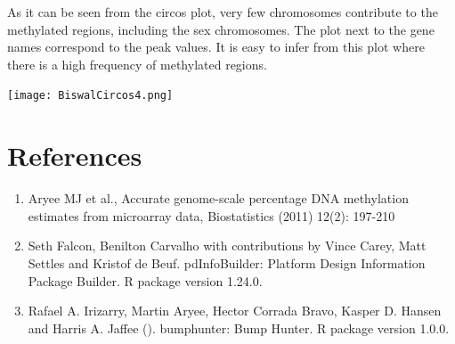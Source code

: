 \documentclass[11pt]{article}
\begin{document}
As it can be seen from the circos plot, very few chromosomes contribute to the methylated regions, including the sex chromosomes. The plot next to the gene names correspond to the peak values. It is easy to infer from this plot where there is a high frequency of methylated regions.

\texttt{[image: BiswalCircos4.png]}



% 
 
% 
%
% 


\section*{References}  
\begin{enumerate}


	\item  Aryee MJ et al., Accurate genome-scale percentage DNA methylation estimates
	  from microarray data, Biostatistics (2011) 12(2): 197-210 	

	\item  Seth Falcon, Benilton Carvalho with contributions by Vince Carey, Matt
	  Settles and Kristof de Beuf. pdInfoBuilder: Platform Design Information
	  Package Builder. R package version 1.24.0.
	
	\item   Rafael A. Irizarry, Martin Aryee, Hector Corrada Bravo, Kasper D. Hansen and	Harris A. Jaffee (). bumphunter: Bump Hunter. R package version 1.0.0.
		
 \end{enumerate}

 
 
 
 
 
\end{document}
